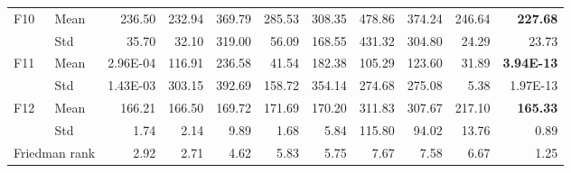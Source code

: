 \begin{tabular}{@{}llrrrrrrrrr@{}}
F10 & Mean & 236.50 & 232.94 & 369.79 & 285.53 & 308.35 & 478.86 & 374.24 & 246.64 & \textbf{227.68} \\
 & Std & 35.70 & 32.10 & 319.00 & 56.09 & 168.55 & 431.32 & 304.80 & 24.29 & 23.73 \\
F11 & Mean & 2.96E-04 & 116.91 & 236.58 & 41.54 & 182.38 & 105.29 & 123.60 & 31.89 & \textbf{3.94E-13} \\
 & Std & 1.43E-03 & 303.15 & 392.69 & 158.72 & 354.14 & 274.68 & 275.08 & 5.38 & 1.97E-13 \\
F12 & Mean & 166.21 & 166.50 & 169.72 & 171.69 & 170.20 & 311.83 & 307.67 & 217.10 & \textbf{165.33} \\
 & Std & 1.74 & 2.14 & 9.89 & 1.68 & 5.84 & 115.80 & 94.02 & 13.76 & 0.89 \\
\midrule
\multicolumn{2}{l}{Friedman rank} & 2.92 & 2.71 & 4.62 & 5.83 & 5.75 & 7.67 & 7.58 & 6.67 & 1.25 \\
\bottomrule
\end{tabular}
